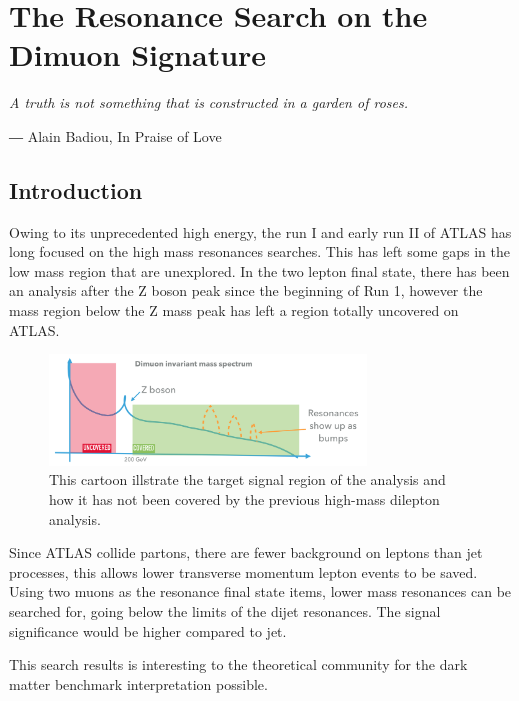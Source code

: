 \chapter{The Resonance Search on the Dimuon Signature}
\label{chapter:dimuon}


\epigraph{\textit{A truth is not something that is constructed in a garden of roses.}} {― Alain Badiou, In Praise of Love}

\section{Introduction}

    Owing to its unprecedented high energy, the run I and early run II of ATLAS has long focused on the high mass resonances searches. This has left some gaps in the low mass region that are unexplored. In the two lepton final state, there has been an analysis after the Z boson peak since the beginning of Run 1, however the mass region below the Z mass peak has left a region totally uncovered on ATLAS.

\begin{figure}[!htb]
    \begin{center}
        \includegraphics[width=0.75\textwidth]{figures/chapter_dimuon/dimuonStudies}        
        \caption{
        This cartoon illstrate the target signal region of the analysis and how it has not been covered by the previous high-mass dilepton analysis. }
            \label{fig:dimuonstudies}
    \end{center}
\end{figure}
   
    Since ATLAS collide partons, there are fewer background on leptons than jet processes, this allows lower transverse momentum lepton events to be saved. Using two muons as the resonance final state items, lower mass resonances can be searched for, going below the limits of the dijet resonances. The signal significance would be higher compared to jet. 

    This search results is interesting to the theoretical community for the dark matter benchmark interpretation possible.

